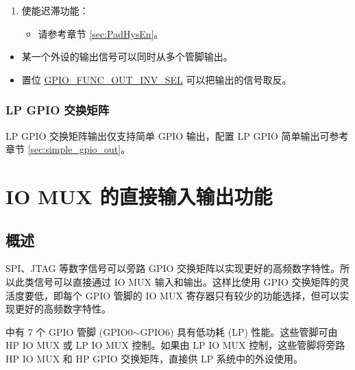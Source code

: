 \documentclass[main\_\_CN.tex]{subfiles}
\begin{document}
\begin{enumerate}
\begin{itemize}
        \item 在开漏模式下，通过置位/清零 \hyperref[fielddesc:IOMUXGPIONFUNWPU]{IO\_MUX\_GPIO\_FUN\_WPU} 和 \hyperref[fielddesc:IOMUXGPIONFUNWPD]{IO\_MUX\_GPIO\_FUN\_WPD} 使能或关闭上拉/下拉电阻。
    \end{itemize}
    \item 使能迟滞功能：
    \begin{itemize}
        \item 请参考章节 \ref{sec:PadHysEn}。
    \end{itemize}
\end{enumerate}

\begin{tiplisting}
\vspace{-2em}
\begin{itemize}
\item \label{output-note-1} 某一个外设的输出信号可以同时从多个管脚输出。
\item \label{output-note-2} 置位 \hyperref[fielddesc:GPIOFUNCNOUTINVSEL]{GPIO\_FUNC\_OUT\_INV\_SEL} 可以把输出的信号取反。
\end{itemize}
\end{tiplisting}

\subsubsection{LP GPIO 交换矩阵}

LP GPIO 交换矩阵输出仅支持简单 GPIO 输出，配置 LP GPIO 简单输出可参考章节 \ref{sec:simple_gpio_out}。

\section{IO MUX 的直接输入输出功能}

\subsection{概述}

SPI、JTAG 等数字信号可以旁路 GPIO 交换矩阵以实现更好的高频数字特性。所以此类信号可以直接通过 IO MUX 输入和输出。这样比使用 GPIO 交换矩阵的灵活度要低，即每个 GPIO 管脚的 IO MUX 寄存器只有较少的功能选择，但可以实现更好的高频数字特性。

\chipname{} 中有 7 个 GPIO 管脚 (GPIO0$\sim$GPIO6) 具有低功耗 (LP) 性能。这些管脚可由 HP IO MUX 或 LP IO MUX 控制。如果由 LP IO MUX 控制，这些管脚将旁路 HP IO MUX 和 HP GPIO 交换矩阵，直接供 LP 系统中的外设使用。
\end{document}
